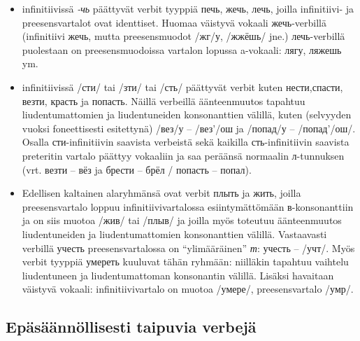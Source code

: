 \documentclass[]{scrartcl}
\providecommand{\tightlist}{%
  \setlength{\itemsep}{0pt}\setlength{\parskip}{0pt}}
\begin{document}
\begin{itemize}
\tightlist
\item
  infinitiivissä \emph{-чь} päättyvät verbit tyyppiä печь, жечь, лечь,
  joilla infinitiivi- ja preesensvartalot ovat identtiset. Huomaa
  väistyvä vokaali жечь-verbillä (infinitiivi жечь, mutta preesensmuodot
  /жг/у, /жжёшь/ jne.) лечь-verbillä puolestaan on preesensmuodoissa
  vartalon lopussa a-vokaali: лягу, ляжешь ym.
\item
  infinitiivissä /сти/ tai /зти/ tai /сть/ päättyvät verbit kuten
  нести,спасти, везти, красть ja попасть. Näillä verbeillä äänteenmuutos
  tapahtuu liudentumattomien ja liudentuneiden konsonanttien välillä,
  kuten (selvyyden vuoksi foneettisesti esitettynä) /вез/у -- /вез'/ош
  ja /попад/у -- /попад'/ош/. Osalla сти-infinitiivin saavista verbeistä
  sekä kaikilla сть-infinitiivin saavista preteritin vartalo päättyy
  vokaaliin ja saa peräänsä normaalin л-tunnuksen (vrt. везти -- вёз ja
  брести -- брёл / попасть -- попал).
\item
  Edellisen kaltainen alaryhmänsä ovat verbit плыть ja жить, joilla
  preesensvartalo loppuu infinitiivivartalossa esiintymättömään
  в-konsonanttiin ja on siis muotoa /жив/ tai /плыв/ ja joilla myös
  toteutuu äänteenmuutos liudentuneiden ja liudentumattomien
  konsonanttien välillä. Vastaavasti verbillä учесть preesensvartalossa
  on ``ylimääräinen'' \emph{т}: учесть -- /учт/. Myös verbit tyyppiä
  умереть kuuluvat tähän ryhmään: niilläkin tapahtuu vaihtelu
  liudentuneen ja liudentumattoman konsonantin välillä. Lisäksi
  havaitaan väistyvä vokaali: infinitiivivartalo on muotoa /умере/,
  preesensvartalo /умр/.
\end{itemize}

\subsection{Epäsäännöllisesti taipuvia
verbejä}\label{epuxe4suxe4uxe4nnuxf6llisesti-taipuvia-verbejuxe4}
\end{document}
